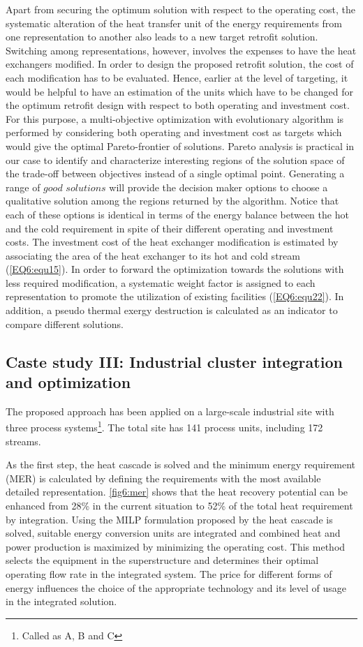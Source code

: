 Apart from securing the optimum solution with respect to the operating cost, the systematic alteration of the heat transfer unit of the energy requirements from one representation to another also leads to a new target retrofit solution. Switching among representations, however, involves the expenses to have the heat exchangers modified. In order to design the proposed retrofit solution, the cost of each modification has to be evaluated. Hence, earlier at the level of targeting, it would be helpful to have an estimation of the units which have to be changed for the optimum retrofit design with respect to both operating and investment cost. For this purpose, a multi-objective optimization with evolutionary algorithm \cite{Molyneaux2010751} is performed by considering both operating and investment cost as targets which would give the optimal Pareto-frontier of solutions. Pareto analysis is practical in our case to identify and characterize interesting regions of the solution space of the trade-off between objectives instead of a single optimal point. Generating a range of $good$ $solutions$ will provide the decision maker options to choose a qualitative solution among the regions returned by the algorithm. Notice that each of these options is identical in terms of the energy balance between the hot and the cold requirement in spite of their different operating and investment costs. The investment cost of the heat exchanger modification is estimated by associating the area of the heat exchanger to its hot and cold stream (\cref{EQ6:equ15}). In order to forward the optimization towards the solutions with less required modification, a systematic weight factor is assigned to each representation to promote the utilization of existing facilities (\cref{EQ6:equ22}). In addition, a pseudo thermal exergy destruction is calculated as an indicator to compare different solutions. 

\subsection{Caste study III: Industrial cluster integration and optimization}

The proposed approach has been applied on a large-scale industrial site with three process systems\footnote{Called as A, B and C}. The total site has 141 process units, including 172 streams. 

As the first step, the heat cascade is solved and the minimum energy requirement (MER) is calculated by defining the requirements with the most available detailed representation. \cref{fig6:mer} shows that the heat recovery potential can be enhanced from 28\% in the current situation to 52\% of the total heat requirement by integration. Using the MILP formulation proposed by \citet{marechal1998process} the heat cascade is solved, suitable energy conversion units are integrated and combined heat and power production is maximized by minimizing the operating cost. This method selects the equipment in the superstructure and determines their optimal operating flow rate in the integrated system. The price for different forms of energy influences the choice of the appropriate technology and its level of usage in the integrated solution. 

